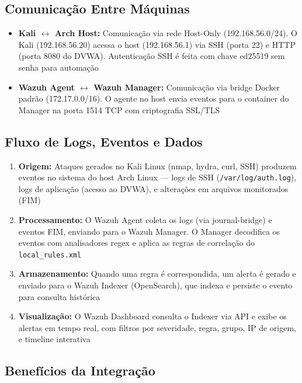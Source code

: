 \documentclass[12pt,a4paper]{article}
\begin{document}
    \subsection{Comunicação Entre Máquinas}

    \begin{itemize}
        \item \textbf{Kali $\leftrightarrow$ Arch Host:} Comunicação via rede Host-Only (192.168.56.0/24). O Kali (192.168.56.20) acessa o host (192.168.56.1) via SSH (porta 22) e HTTP (porta 8080 do DVWA). Autenticação SSH é feita com chave ed25519 sem senha para automação
        \item \textbf{Wazuh Agent $\leftrightarrow$ Wazuh Manager:} Comunicação via bridge Docker padrão (172.17.0.0/16). O agente no host envia eventos para o container do Manager na porta 1514 TCP com criptografia SSL/TLS
    \end{itemize}

    \subsection{Fluxo de Logs, Eventos e Dados}

    \begin{enumerate}
        \item \textbf{Origem:} Ataques gerados no Kali Linux (nmap, hydra, curl, SSH) produzem eventos no sistema do host Arch Linux — logs de SSH (\texttt{/var/log/auth.log}), logs de aplicação (acesso ao DVWA), e alterações em arquivos monitorados (FIM)
        \item \textbf{Processamento:} O Wazuh Agent coleta os logs (via journal-bridge) e eventos FIM, enviando para o Wazuh Manager. O Manager decodifica os eventos com analisadores regex e aplica as regras de correlação do \texttt{local\_rules.xml}
        \item \textbf{Armazenamento:} Quando uma regra é correspondida, um alerta é gerado e enviado para o Wazuh Indexer (OpenSearch), que indexa e persiste o evento para consulta histórica
        \item \textbf{Visualização:} O Wazuh Dashboard consulta o Indexer via API e exibe os alertas em tempo real, com filtros por severidade, regra, grupo, IP de origem, e timeline interativa
    \end{enumerate}

    \subsection{Benefícios da Integração}
\end{document}

